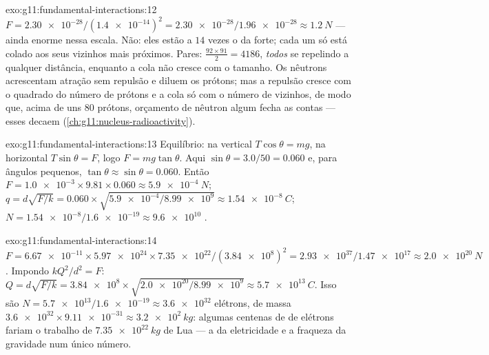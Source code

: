 \begin{solution}{exo:g11:fundamental-interactions:12}
$F = \num{2.30e-28}/(\num{1.4e-14})^2 = \num{2.30e-28}/\num{1.96e-28}
\approx \qty{1.2}{N}$ --- ainda enorme nessa escala. Não: eles estão a
$14$ vezes o  da  forte; cada um só está colado aos seus
vizinhos mais próximos. Pares: $\frac{92 \times 91}{2} = 4186$,
\emph{todos} se repelindo a qualquer distância, enquanto a cola não
cresce com o tamanho. Os nêutrons acrescentam atração sem repulsão e
diluem os prótons; mas a repulsão cresce com o quadrado do número de
prótons e a cola só com o número de vizinhos, de modo que, acima de uns
$80$ prótons, orçamento de nêutron algum fecha as contas --- esses
 decaem (\cref{ch:g11:nucleus-radioactivity}).
\end{solution}

\begin{solution}{exo:g11:fundamental-interactions:13}
Equilíbrio: na vertical $T\cos\theta = mg$, na horizontal
$T\sin\theta = F$, logo $F = mg\tan\theta$. Aqui
$\sin\theta = 3.0/50 = 0.060$ e, para ângulos pequenos,
$\tan\theta \approx \sin\theta = 0.060$. Então
$F = \num{1.0e-3} \times 9.81 \times 0.060 \approx \qty{5.9e-4}{N}$;
$q = d\sqrt{F/k} = 0.060 \times \sqrt{\num{5.9e-4}/\num{8.99e9}}
\approx \qty{1.54e-8}{C}$;
$N = \num{1.54e-8}/\num{1.6e-19} \approx \num{9.6e10}$ .
\end{solution}

\begin{solution}{exo:g11:fundamental-interactions:14}
$F = \num{6.67e-11} \times \num{5.97e24} \times \num{7.35e22} /
(\num{3.84e8})^2 = \num{2.93e37}/\num{1.47e17} \approx \qty{2.0e20}{N}$.
Impondo $kQ^2/d^2 = F$:
$Q = d\sqrt{F/k} = \num{3.84e8} \times \sqrt{\num{2.0e20}/\num{8.99e9}}
\approx \qty{5.7e13}{C}$. Isso são
$N = \num{5.7e13}/\num{1.6e-19} \approx \num{3.6e32}$ elétrons, de massa
$\num{3.6e32} \times \num{9.11e-31} \approx \qty{3.2e2}{kg}$: algumas
centenas de  de elétrons fariam o trabalho de
$\qty{7.35e22}{kg}$ de Lua --- a  da eletricidade e a fraqueza da
gravidade num único número.
\end{solution}


